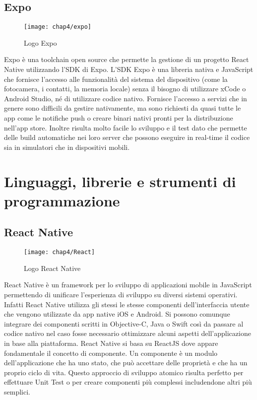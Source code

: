 \subsection{Expo} \label{subsec:expo}
	\begin{figure}[H] 
		\centering
		\texttt{[image: chap4/expo]}
		\caption{Logo Expo}
	\end{figure}
Expo è una toolchain open source che permette la gestione di un progetto React 
Native utilizzando l'SDK di Expo. L'SDK Expo è una libreria nativa e JavaScript 
che fornisce l'accesso alle funzionalità del sistema del dispositivo (come la 
fotocamera, i contatti, la memoria locale) senza il bisogno di utilizzare xCode 
o Android Studio, né di utilizzare codice nativo. Fornisce l'accesso a servizi 
che in genere sono difficili da gestire nativamente, ma sono richiesti da quasi 
tutte le app come le notifiche push o creare binari nativi pronti per la 
distribuzione nell'app store.
Inoltre risulta molto facile lo sviluppo e il test dato che permette delle 
build automatiche nei loro server che possono eseguire in real-time il codice 
sia in simulatori che in dispositivi mobili.


\section{Linguaggi, librerie e strumenti di programmazione}

\subsection{React Native}
\begin{figure}[H] 
	\centering
	\texttt{[image: chap4/React]}
	\caption{Logo React Native}
\end{figure}
React Native è un framework per lo sviluppo di applicazioni mobile in JavaScript 
permettendo di unificare l'esperienza di sviluppo su diversi sistemi operativi. 
Infatti React Native utilizza gli stessi le stesse componenti dell'interfaccia 
utente che vengono utilizzate da app native iOS e Android.
Si possono comunque integrare dei componenti scritti in Objective-C, 
Java o Swift così da passare al codice nativo nel caso fosse necessario 
ottimizzare alcuni aspetti dell'applicazione in base alla piattaforma. 
React Native si basa su ReactJS dove appare fondamentale il concetto di 
componente. Un componente è un modulo dell'applicazione che ha uno stato, 
che può accettare delle proprietà e che ha un proprio ciclo di vita. 
Questo approccio di sviluppo atomico risulta perfetto per effettuare Unit Test 
o per creare componenti più complessi includendone altri più semplici.

